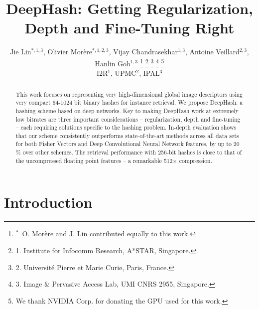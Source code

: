 \documentclass[10pt,twocolumn,letterpaper]{article}
\begin{document}
\title{DeepHash: Getting Regularization, Depth and Fine-Tuning Right}


\renewcommand\footnotemark{}
\renewcommand\footnoterule{}

\author{
Jie Lin{$^{*,1,3}$},
Olivier Mor\`ere{$^{*,1,2,3}$}, 
Vijay Chandrasekhar{$^{1,3}$}, 
Antoine Veillard{$^{2,3}$}, 
Hanlin Goh{$^{1,3}$}%
\thanks{{$^{*}$}\, O. Mor\`ere and J. Lin contributed equally to this work.}
\thanks{1. Institute for Infocomm Research, A*STAR, Singapore.}
\thanks{2. Universit\'e Pierre et Marie Curie, Paris, France.}
\thanks{3. Image \& Pervasive Access Lab, UMI CNRS 2955, Singapore.} 
\thanks{We thank NVIDIA Corp. for donating the GPU used for this work.}\\
{I2R{$^{1}$}, UPMC{$^{2}$}, IPAL{$^{3}$}}}

 
\maketitle


















\begin{abstract}


This work focuses on representing very high-dimensional global image descriptors using very compact 64-1024 bit binary hashes for instance retrieval. 
We propose DeepHash: a hashing scheme based on deep networks.
Key to making DeepHash work at extremely low bitrates are three important considerations -- regularization, depth and fine-tuning -- each requiring solutions specific to the hashing problem.
In-depth evaluation shows that our scheme consistently outperforms state-of-the-art methods across all data sets for both Fisher Vectors and Deep Convolutional Neural Network features, by up to 20$\%$ over other schemes. 
The retrieval performance with 256-bit hashes is close to that of the uncompressed floating point features -- a remarkable 512$\times$  compression.
\end{abstract}



\section{Introduction}
\end{document}
